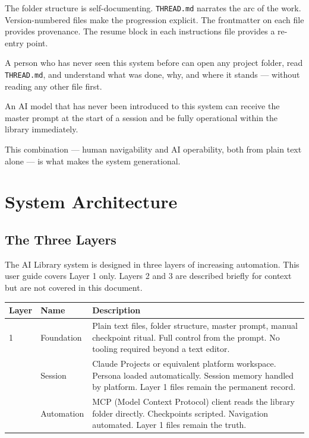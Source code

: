 \documentclass[12pt,letterpaper]{article}
\begin{document}
The folder structure is self-documenting. \texttt{THREAD.md} narrates the
arc of the work. Version-numbered files make the progression explicit.
The frontmatter on each file provides provenance. The resume block in each
instructions file provides a re-entry point.

A person who has never seen this system before can open any project folder,
read \texttt{THREAD.md}, and understand what was done, why, and where it
stands --- without reading any other file first.

An AI model that has never been introduced to this system can receive the
master prompt at the start of a session and be fully operational within
the library immediately.

This combination --- human navigability and AI operability, both from
plain text alone --- is what makes the system generational.

\section{System Architecture}

\subsection{The Three Layers}

The AI Library system is designed in three layers of increasing automation.
This user guide covers Layer 1 only. Layers 2 and 3 are described briefly
for context but are not covered in this document.

\begin{center}
\begin{tabular}{@{}lp{4cm}p{6.5cm}@{}}
\toprule
\textbf{Layer} & \textbf{Name} & \textbf{Description} \\
\midrule
1 & Foundation & Plain text files, folder structure, master prompt,
                 manual checkpoint ritual. Full control from the prompt.
                 No tooling required beyond a text editor. \\
\addlinespace
2 & Session & Claude Projects or equivalent platform workspace.
              Persona loaded automatically. Session memory handled by platform.
              Layer 1 files remain the permanent record. \\
\addlinespace
3 & Automation & MCP (Model Context Protocol) client reads the library folder
                 directly. Checkpoints scripted. Navigation automated.
                 Layer 1 files remain the truth. \\
\bottomrule
\end{tabular}
\end{center}
\end{document}
